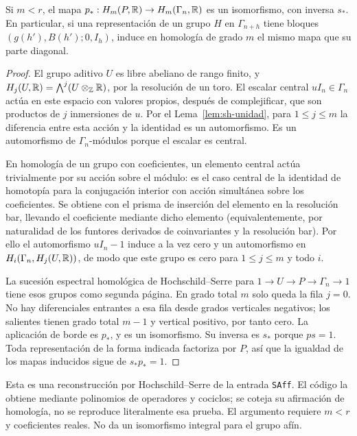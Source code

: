 \begin{proposicion}
\label{prop:sh-afin}
Si $m<r$, el mapa $p_*:H_m(P,\mathbb{R})\to H_m(\Gamma_n,\mathbb{R})$ es un isomorfismo, con inversa $s_*$. En particular, si una representación de un grupo $H$ en $\Gamma_{n+h}$ tiene bloques $(g(h'),B(h');0,I_h)$, induce en homología de grado $m$ el mismo mapa que su parte diagonal.
\end{proposicion}
\begin{proof}
El grupo aditivo $U$ es libre abeliano de rango finito, y $H_j(U,\mathbb{R})=\bigwedge^j(U\otimes_{\mathbb{Z}}\mathbb{R})$, por la resolución de un toro. El escalar central $uI_n\in\Gamma_n$ actúa en este espacio con valores propios, después de complejificar, que son productos de $j$ inmersiones de $u$. Por el Lema~\ref{lem:sh-unidad}, para $1\le j\le m$ la diferencia entre esta acción y la identidad es un automorfismo. Es un automorfismo de $\Gamma_n$-módulos porque el escalar es central.

En homología de un grupo con coeficientes, un elemento central actúa trivialmente por su acción sobre el módulo: es el caso central de la identidad de homotopía para la conjugación interior con acción simultánea sobre los coeficientes. Se obtiene con el prisma de inserción del elemento en la resolución bar, llevando el coeficiente mediante dicho elemento (equivalentemente, por naturalidad de los funtores derivados de coinvariantes y la resolución bar). Por ello el automorfismo $uI_n-1$ induce a la vez cero y un automorfismo en $H_i(\Gamma_n,H_j(U,\mathbb{R}))$, de modo que este grupo es cero para $1\le j\le m$ y todo $i$.

La sucesión espectral homológica de Hochschild--Serre para $1\to U\to P\to\Gamma_n\to1$ tiene esos grupos como segunda página. En grado total $m$ solo queda la fila $j=0$. No hay diferenciales entrantes a esa fila desde grados verticales negativos; los salientes tienen grado total $m-1$ y vertical positivo, por tanto cero. La aplicación de borde es $p_*$, y es un isomorfismo. Su inversa es $s_*$ porque $ps=1$. Toda representación de la forma indicada factoriza por $P$, así que la igualdad de los mapas inducidos sigue de $s_*p_*=1$.
\end{proof}

Esta es una reconstrucción por Hochschild--Serre de la entrada \texttt{SAff}. El código la obtiene mediante polinomios de operadores y cociclos; se coteja su afirmación de homología, no se reproduce literalmente esa prueba. El argumento requiere $m<r$ y coeficientes reales. No da un isomorfismo integral para el grupo afín.

